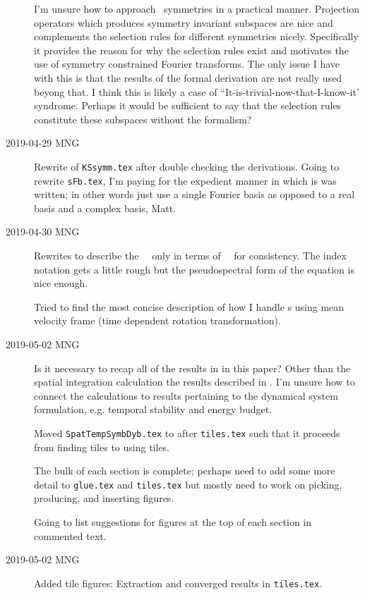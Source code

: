 \begin{description}
I'm unsure how to approach \spt\ symmetries in a practical manner.
Projection operators which produces symmetry invariant
subspaces are nice and complements the selection rules for different
symmetries nicely. Specifically it provides the reason for why
the selection rules exist and motivates the use of symmetry
constrained Fourier transforms. The only issue I have with this
is that the results of the formal derivation are not really used
beyong that.
I think this is likely a case of ``It-is-trivial-now-that-I-know-it' syndrome.
Perhaps it would be
sufficient to say that the selection rules constitute these subspaces
without the formalism?

\item[2019-04-29 MNG]
Rewrite of \texttt{KSsymm.tex} after double checking the
derivations.
Going to rewrite \texttt{sFb.tex}, I'm paying for the expedient
manner in which is was written; in other words just use a single
Fourier basis as opposed to a real basis and a complex basis, Matt.

\item[2019-04-30 MNG]
Rewrites to describe the \spt\ \KSe\ only in terms of \rv\
\Fcs\ for consistency. The index notation gets a little rough
but the pseudospectral form of the equation is nice enough.

Tried to find the most concise description of how I handle
\rpo s using mean velocity frame (time dependent rotation
transformation).

\item[2019-05-02 MNG]
Is it necessary to recap all of the results in 
in this paper? Other than the spatial integration calculation the results
described in \refrefs{DasBuch,SCD07}. I'm unsure how to connect the
{\spt} calculations to results pertaining to the dynamical system
formulation, e.g. temporal stability and energy budget.

Moved \texttt{SpatTempSymbDyb.tex} to after \texttt{tiles.tex} such that
it proceeds from finding tiles to using tiles.

The bulk of each section is complete; perhaps need to add some more
detail to \texttt{glue.tex} and \texttt{tiles.tex} but mostly need to
work on picking, producing, and inserting figures.

Going to list suggestions for figures at the top of each section in
commented text.

\item[2019-05-02 MNG]
Added tile figures: Extraction and converged results in \texttt{tiles.tex}.


\end{description}
